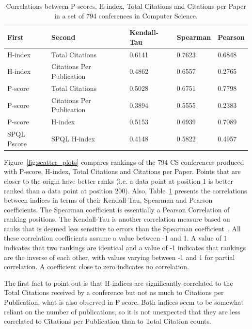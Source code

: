 \documentclass[notitlepage]{svjour3}
\begin{document}
\begin{table}[ht!]
  \small
  \centering
  \begin{tabular}{lllll} 
  \toprule
  First & Second & Kendall-Tau & Spearman & Pearson \\ 
  \midrule
  H-index     & Total Citations           & 0.6141 & 0.7623 & 0.6848 \\
  H-index     & Citations Per Publication & 0.4862 & 0.6557 & 0.2765 \\
  P-score     & Total Citations           & 0.5028 & 0.6751 & 0.7798 \\
  P-score     & Citations Per Publication & 0.3894 & 0.5555 & 0.2383 \\
  P-score     & H-index                   & 0.5153 & 0.6939 & 0.7089 \\
  SPQL Pscore & SPQL H-index              & 0.4148 & 0.5822 & 0.4957 \\
  \bottomrule
  \end{tabular}
  \caption{Correlations between P-scores, H-index, Total Citations 
  and Citations per Paper in a set of 794 conferences in Computer Science.}
  \label{tab:correlations}
\end{table}

Figure~\ref{fig:scatter_plots} compares rankings of the 794 CS conferences produced with
P-score, H-index, Total Citations and Citations per Paper.
Points that are closer to the origin have better ranks (i.e. a data point at position 1 is 
better ranked than a data point at position 200). Also, Table~\ref{tab:correlations} presents the
correlations between indices in terms of their Kendall-Tau, Spearman and Pearson coefficients.
The Spearman coefficient is essentially a Pearson Correlation of ranking positions. The
Kendall-Tau is another correlation measure based on ranks that is deemed less
sensitive to errors than the Spearman coefficient~\cite{Kendall1955,Baeza-Yates2011}. All these 
correlation coefficients assume a value between -1 and 1. A value of 1 indicates that two rankings are 
identical and a value of -1 indicates that rankings are the inverse of each other, with values varying 
between -1 and 1 for partial correlation. A coefficient close to zero indicates no correlation.

The first fact to point out is that H-indices are significantly correlated to the Total Citations
received by a conference but not as much to Citations per Publication,
what is also observed in P-score. Both indices seem to be somewhat reliant on the number of 
publications, so it is not unexpected that they are less correlated to Citations per Publication
than to Total Citation counts. 
\end{document}
